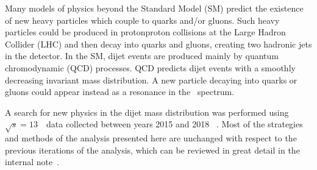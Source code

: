 Many models of physics beyond the Standard Model (SM) predict the
existence of new heavy particles which couple to quarks and/or
gluons. 
Such heavy particles could be produced in proton\text{--}proton
collisions at the Large Hadron Collider (LHC) and then decay into
quarks and gluons, creating two hadronic jets in the detector. 
In the SM, dijet events are produced mainly by quantum chromodynamic
(QCD) processes. 
QCD predicts dijet events with a smoothly decreasing invariant mass
distribution. A new particle decaying into quarks or gluons could appear instead as
a resonance in the \mjj\ spectrum.  

A search for new physics in the dijet mass distribution was performed
using $\sqrt{s} = 13$~\TeV\ data collected between years 2015 and
2018~ \cite{EXOT-2019-03}. 
Most of the strategies and methods of the analysis presented here are
unchanged with respect to the previous iterations of the
analysis, which can be reviewed in great detail in the internal
note~\cite{Nishu:2646455}.





